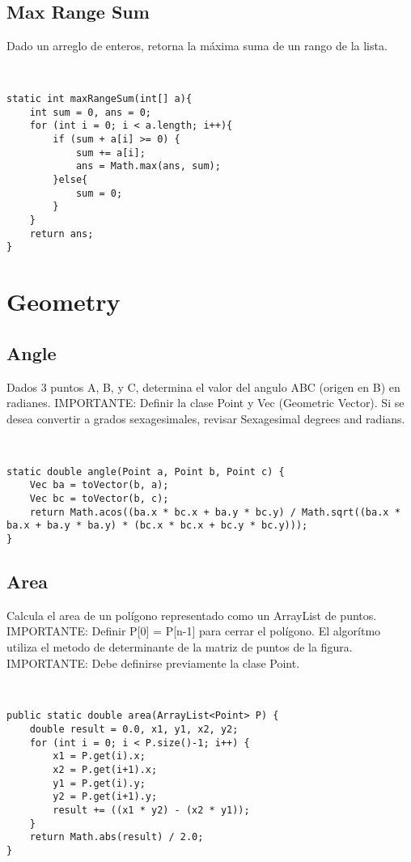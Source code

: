\documentclass[11pt,letterpaper,twocolumn,twosided]{article}
\begin{document}
\subsection{Max Range Sum}
Dado un arreglo de enteros, retorna la m\'axima suma de un rango de la lista.
\begin{lstlisting}


static int maxRangeSum(int[] a){
	int sum = 0, ans = 0;
	for (int i = 0; i < a.length; i++){
		if (sum + a[i] >= 0) {  
			sum += a[i];
		    ans = Math.max(ans, sum);          
	    }else{
	    	sum = 0;
	    }
	}
	return ans;
}
\end{lstlisting}

\section{Geometry}

\subsection{Angle}
Dados 3 puntos A, B, y C, determina el valor del angulo ABC (origen en B) en radianes. IMPORTANTE: Definir la clase Point y Vec (Geometric Vector). Si se desea convertir a grados sexagesimales, revisar Sexagesimal degrees and radians.
\begin{lstlisting}


static double angle(Point a, Point b, Point c) { 
  	Vec ba = toVector(b, a);
  	Vec bc = toVector(b, c);
  	return Math.acos((ba.x * bc.x + ba.y * bc.y) / Math.sqrt((ba.x * ba.x + ba.y * ba.y) * (bc.x * bc.x + bc.y * bc.y))); 
}
\end{lstlisting}

\subsection{Area}
Calcula el area de un pol\'igono representado como un ArrayList de puntos. IMPORTANTE: Definir P[0] = P[n-1] para cerrar el pol\'igono. El algor\'itmo utiliza el metodo de determinante de la matriz de puntos de la figura. IMPORTANTE: Debe definirse previamente la clase Point.
\begin{lstlisting}


public static double area(ArrayList<Point> P) {
    double result = 0.0, x1, y1, x2, y2;
    for (int i = 0; i < P.size()-1; i++) {
    	x1 = P.get(i).x; 
    	x2 = P.get(i+1).x;
    	y1 = P.get(i).y; 
    	y2 = P.get(i+1).y;
    	result += ((x1 * y2) - (x2 * y1));
    }
    return Math.abs(result) / 2.0; 
}
\end{lstlisting}
\end{document}
